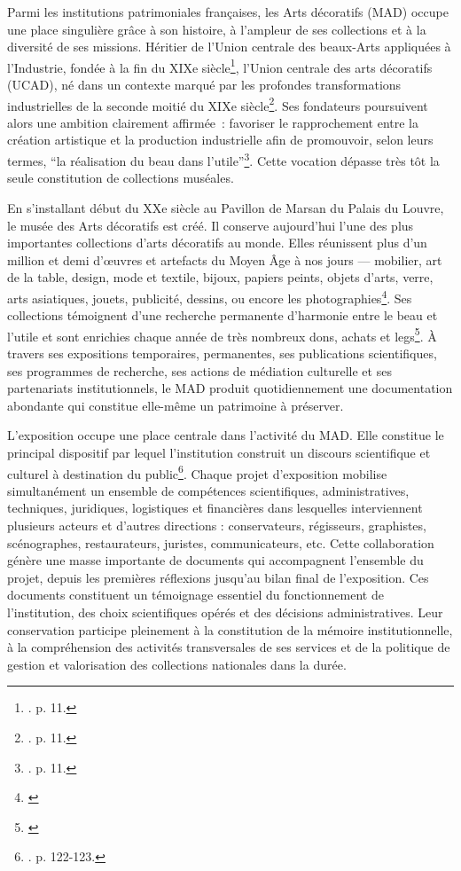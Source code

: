Parmi les institutions patrimoniales françaises, les Arts décoratifs (MAD) occupe une place singulière grâce à son histoire, à l’ampleur de ses collections et à la diversité de ses missions. Héritier de l’Union centrale des beaux-Arts appliquées à l’Industrie, fondée à la fin du XIXe siècle\footnote{\cite{brunhammer-1992}. p. 11.}, l'Union centrale des arts décoratifs (UCAD), né dans un contexte marqué par les profondes transformations industrielles de la seconde moitié du XIXe siècle\footnote{\cite{brunhammer-1992}. p. 11.}. Ses fondateurs poursuivent alors une ambition clairement affirmée : favoriser le rapprochement entre la création artistique et la production industrielle afin de promouvoir, selon leurs termes, \enquote{la réalisation du beau dans l’utile}\footnote{\cite{brunhammer-1992}. p. 11.}. Cette vocation dépasse très tôt la seule constitution de collections muséales. 

En s'installant début du XXe siècle au Pavillon de Marsan du Palais du Louvre, le musée des Arts décoratifs est créé. Il conserve aujourd’hui l’une des plus importantes collections d’arts décoratifs au monde. Elles réunissent plus d’un million et demi d’œuvres et artefacts du Moyen Âge à nos jours — mobilier, art de la table, design, mode et textile, bijoux, papiers peints, objets d’arts, verre, arts asiatiques, jouets, publicité, dessins, ou encore les photographies\footnote{\cite{mad-collections}}. Ses collections témoignent d’une recherche permanente d’harmonie entre le beau et l’utile et sont enrichies chaque année de très nombreux dons, achats et legs\footnote{\cite{mad-collections}}. À travers ses expositions temporaires, permanentes, ses publications scientifiques, ses programmes de recherche, ses actions de médiation culturelle et ses partenariats institutionnels, le MAD produit quotidiennement une documentation abondante qui constitue elle-même un patrimoine à préserver.

L'exposition occupe une place centrale dans l'activité du MAD. Elle constitue le principal dispositif par lequel l’institution construit un discours scientifique et culturel à destination du public\footnote{\cite{drouguet-gob-2016}. p. 122-123.}. Chaque projet d’exposition mobilise simultanément un ensemble de compétences scientifiques, administratives, techniques, juridiques, logistiques et financières dans lesquelles interviennent plusieurs acteurs et d'autres directions : conservateurs, régisseurs, graphistes, scénographes, restaurateurs, juristes, communicateurs, etc. Cette collaboration génère une masse importante de documents qui accompagnent l’ensemble du projet, depuis les premières réflexions jusqu’au bilan final de l’exposition. Ces documents constituent un témoignage essentiel du fonctionnement de l’institution, des choix scientifiques opérés et  des décisions administratives. Leur conservation participe pleinement à la constitution de la mémoire institutionnelle, à la compréhension des activités transversales de ses services et de la politique de gestion et valorisation des collections nationales dans la durée.


